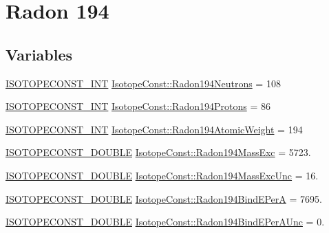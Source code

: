 \hypertarget{group___isotope_const-_radon-_rn194}{}\section{Radon 194}
\label{group___isotope_const-_radon-_rn194}
\subsection*{Variables}
\begin{DoxyCompactItemize}
\item 
\mbox{\hyperlink{group___isotope_const-_macros_ga5f18360b3e99483a35c32d789e62621c}{I\+S\+O\+T\+O\+P\+E\+C\+O\+N\+S\+T\+\_\+\+I\+NT}} \mbox{\hyperlink{group___isotope_const-_radon-_rn194_ga63daeeb203cbc08c3d0729821886e927}{Isotope\+Const\+::\+Radon194\+Neutrons}} = 108
\item 
\mbox{\hyperlink{group___isotope_const-_macros_ga5f18360b3e99483a35c32d789e62621c}{I\+S\+O\+T\+O\+P\+E\+C\+O\+N\+S\+T\+\_\+\+I\+NT}} \mbox{\hyperlink{group___isotope_const-_radon-_rn194_ga6a8f5ce2994dc52c06b7b13ab0ef95a3}{Isotope\+Const\+::\+Radon194\+Protons}} = 86
\item 
\mbox{\hyperlink{group___isotope_const-_macros_ga5f18360b3e99483a35c32d789e62621c}{I\+S\+O\+T\+O\+P\+E\+C\+O\+N\+S\+T\+\_\+\+I\+NT}} \mbox{\hyperlink{group___isotope_const-_radon-_rn194_ga9a3348941bd6fb588e031504a801d8d6}{Isotope\+Const\+::\+Radon194\+Atomic\+Weight}} = 194
\item 
\mbox{\hyperlink{group___isotope_const-_macros_ga8f45a7272ce02c0b4c65c44636ed719a}{I\+S\+O\+T\+O\+P\+E\+C\+O\+N\+S\+T\+\_\+\+D\+O\+U\+B\+LE}} \mbox{\hyperlink{group___isotope_const-_radon-_rn194_ga1263615cc43489858d1ac9ad8722d988}{Isotope\+Const\+::\+Radon194\+Mass\+Exc}} = 5723.
\item 
\mbox{\hyperlink{group___isotope_const-_macros_ga8f45a7272ce02c0b4c65c44636ed719a}{I\+S\+O\+T\+O\+P\+E\+C\+O\+N\+S\+T\+\_\+\+D\+O\+U\+B\+LE}} \mbox{\hyperlink{group___isotope_const-_radon-_rn194_ga19cdd077cf9374e406b1d44950427d68}{Isotope\+Const\+::\+Radon194\+Mass\+Exc\+Unc}} = 16.
\item 
\mbox{\hyperlink{group___isotope_const-_macros_ga8f45a7272ce02c0b4c65c44636ed719a}{I\+S\+O\+T\+O\+P\+E\+C\+O\+N\+S\+T\+\_\+\+D\+O\+U\+B\+LE}} \mbox{\hyperlink{group___isotope_const-_radon-_rn194_gaf7e800a87b1af2e7129d5d9dff4f5dc4}{Isotope\+Const\+::\+Radon194\+Bind\+E\+PerA}} = 7695.
\item 
\mbox{\hyperlink{group___isotope_const-_macros_ga8f45a7272ce02c0b4c65c44636ed719a}{I\+S\+O\+T\+O\+P\+E\+C\+O\+N\+S\+T\+\_\+\+D\+O\+U\+B\+LE}} \mbox{\hyperlink{group___isotope_const-_radon-_rn194_gac99dc3177ac58f88593ea65d28032aef}{Isotope\+Const\+::\+Radon194\+Bind\+E\+Per\+A\+Unc}} = 0.

\end{DoxyCompactItemize}
